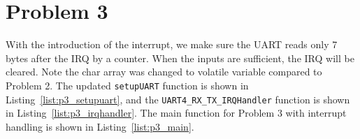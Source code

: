 \section*{Problem 3}
With the introduction of the interrupt, we make sure the UART reads only 7 bytes after the IRQ by a counter. When the inputs are sufficient, the IRQ will be cleared.  Note the char array was changed to volatile variable compared to Problem 2. The updated \texttt{setupUART} function is shown in Listing~\ref{list:p3_setupuart}, and the \texttt{UART4\_RX\_TX\_IRQHandler} function is shown in Listing~\ref{list:p3_irqhandler}. The main function for Problem 3 with interrupt handling is shown in Listing~\ref{list:p3_main}.


